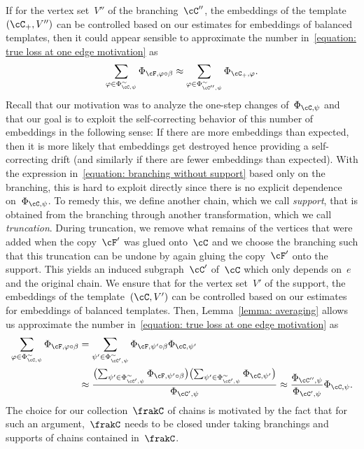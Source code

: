 \documentclass[11pt]{amsart}
\DeclarePairedDelimiter{\paren}{\lparen}{\rparen}
\def\phi{\varphi}
\theoremstyle{definition}
\numberwithin{equation}{section}
\begin{document}
	If for the vertex set~$V''$ of the branching~$\cC''$, the embeddings of the template~$(\cC_+,V'')$ can be controlled based on our estimates for embeddings of balanced templates, then it could appear sensible to approximate the number in~\eqref{equation: true loss at one edge motivation} as
	\begin{equation}\label{equation: branching without support}
		\sum_{\phi\in\Phi_{\cC,\psi}^\sim}\Phi_{\cF,\phi\circ\beta}
		\approx\sum_{\phi\in\Phi_{\cC'',\psi}^\sim}\Phi_{\cC_+,\phi}.
	\end{equation}
	Recall that our motivation was to analyze the one-step changes of~$\Phi_{\cC,\psi}$ and that our goal is to exploit the self-correcting behavior of this number of embeddings in the following sense: If there are more embeddings than expected, then it is more likely that embeddings get destroyed hence providing a self-correcting drift (and similarly if there are fewer embeddings than expected).
	With the expression in~\eqref{equation: branching without support} based only on the branching, this is hard to exploit directly since there is no explicit dependence on~$\Phi_{\cC,\psi}$.
	To remedy this, we define another chain, which we call \emph{support}, that is obtained from the branching through another transformation, which we call \emph{truncation}.
	During truncation, we remove what remains of the vertices that were added when the copy~$\cF'$ was glued onto~$\cC$ and we choose the branching such that this truncation can be undone by again gluing the copy~$\cF'$ onto the support.
	This yields an induced subgraph~$\cC'$ of~$\cC$ which only depends on~$e$ and the original chain.
	We ensure that for the vertex set~$V'$ of the support, the embeddings of the template~$(\cC,V')$ can be controlled based on our estimates for embeddings of balanced templates.
	Then, Lemma~\ref{lemma: averaging} allows us approximate the number in~\eqref{equation: true loss at one edge motivation} as
	\begin{equation}\label{equation: approximating one step motivation}
		\begin{aligned}
			\sum_{\phi\in\Phi_{\cC,\psi}^\sim}\Phi_{\cF,\phi\circ\beta}
			&=\sum_{\psi'\in \Phi^\sim_{\cC',\psi}} \Phi_{\cF,\psi'\circ\beta} \Phi_{\cC,\psi'}\\
			&\approx \frac{\paren[\big]{\sum_{ \psi'\in\Phi_{\cC',\psi}^\sim }\Phi_{\cF,\psi'\circ\beta} }\paren[\big]{\sum_{ \psi'\in\Phi_{\cC',\psi}^\sim }\Phi_{\cC,\psi'} }}{\Phi_{\cC',\psi}}
			\approx\frac{\Phi_{\cC'',\psi} }{\Phi_{\cC',\psi}}\Phi_{\cC,\psi}.
		\end{aligned}
	\end{equation}
	The choice for our collection~$\frakC$ of chains is motivated by the fact that for such an argument,~$\frakC$ needs to be closed under taking branchings and supports of chains contained in~$\frakC$.
	
\end{document}
